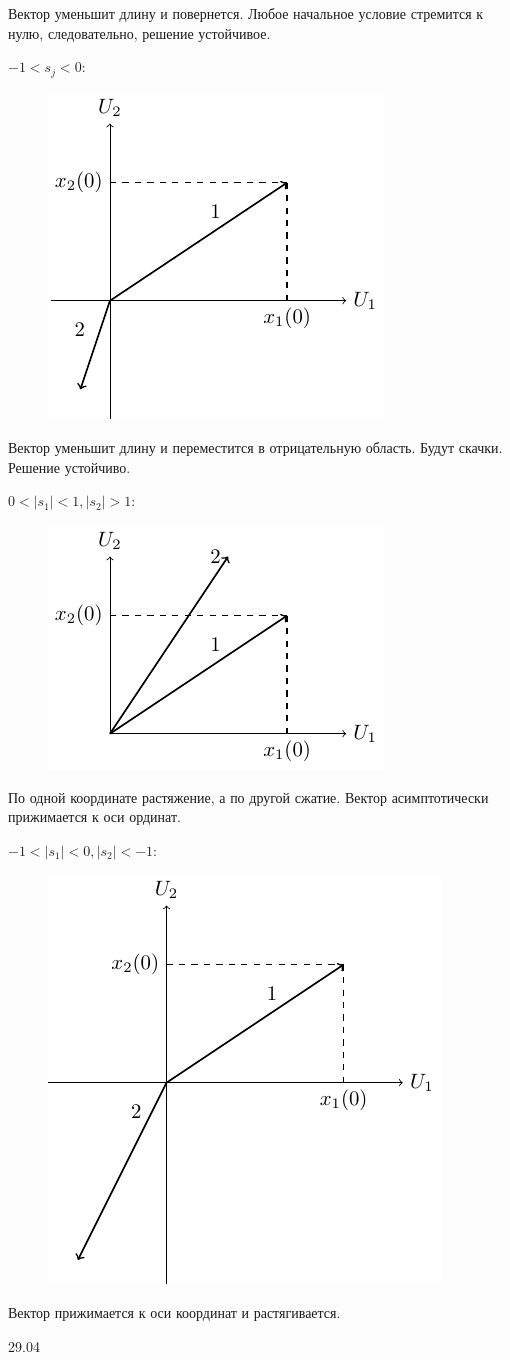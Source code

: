 Вектор уменьшит длину и повернется. Любое начальное условие стремится к нулю, следовательно, решение устойчивое.

$-1<s_j<0$:
\begin{figure}[H]
	\centering
	\includegraphics[width=0.35\linewidth]{fig/fig35.pdf}   
\end{figure}

Вектор уменьшит длину и переместится в отрицательную область. Будут скачки. Решение устойчиво.

$0<|s_1|<1, |s_2|>1$:
\begin{figure}[H]
	\centering
	\includegraphics[width=0.35\linewidth]{fig/fig36.pdf}   
\end{figure}

По одной координате растяжение, а по другой сжатие. Вектор асимптотически прижимается к оси ординат.

$-1<|s_1|<0, |s_2|<-1$:
\begin{figure}[H]
	\centering
	\includegraphics[width=0.35\linewidth]{fig/fig37.pdf}   
\end{figure}

Вектор прижимается к оси координат и растягивается.

29.04

